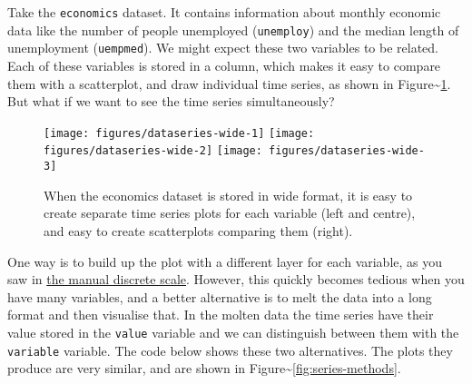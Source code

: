 
Take the \texttt{economics} dataset. It contains information about
monthly economic data like the number of people unemployed
(\texttt{unemploy}) and the median length of unemployment
(\texttt{uempmed}). We might expect these two variables to be related.
Each of these variables is stored in a column, which makes it easy to
compare them with a scatterplot, and draw individual time series, as
shown in Figure\textasciitilde{}\ref{fig:series-wide}. But what if we
want to see the time series simultaneously?
 

\begin{Shaded}
\begin{Highlighting}[]
  \NormalTok{)}
  \NormalTok{)}
 \StringTok{ }\NormalTok{()}
\end{Highlighting}
\end{Shaded}

\begin{figure}
\texttt{[image: figures/dataseries-wide-1]} \texttt{[image: figures/dataseries-wide-2]} \texttt{[image: figures/dataseries-wide-3]} \caption{When the economics dataset is stored in wide format, it is easy to create separate time series plots for each variable (left and centre), and easy to create scatterplots comparing them (right).\label{fig:series-wide}}
\end{figure}

One way is to build up the plot with a different layer for each
variable, as you saw in \hyperref[sub:scale-manual]{the manual discrete
scale}. However, this quickly becomes tedious when you have many
variables, and a better alternative is to melt the data into a long
format and then visualise that. In the molten data the time series have
their value stored in the \texttt{value} variable and we can distinguish
between them with the \texttt{variable} variable. The code below shows
these two alternatives. The plots they produce are very similar, and are
shown in Figure\textasciitilde{}\ref{fig:series-methods}.

